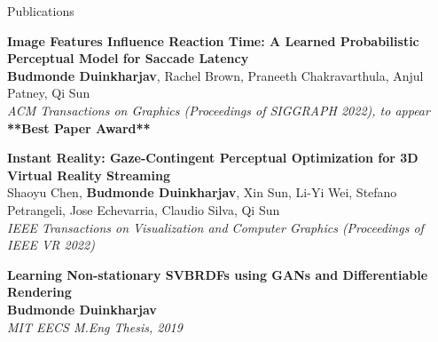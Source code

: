 \documentclass{resume}
\begin{document}
\begin{area}{Publications}
    \item
        \textbf{Image Features Influence Reaction Time: A Learned Probabilistic Perceptual Model for Saccade Latency} \\
        \textbf{Budmonde Duinkharjav}, Rachel Brown, Praneeth Chakravarthula, Anjul Patney, Qi Sun \\
        \emph{ACM Transactions on Graphics (Proceedings of SIGGRAPH 2022), to appear}\\
        \textbf{**Best Paper Award**}
    \item
        \textbf{Instant Reality: Gaze-Contingent Perceptual Optimization for 3D Virtual Reality Streaming} \\
        Shaoyu Chen, \textbf{Budmonde Duinkharjav}, Xin Sun, Li-Yi Wei, Stefano Petrangeli, Jose Echevarria, Claudio Silva, Qi Sun \\
        \emph{IEEE Transactions on Visualization and Computer Graphics (Proceedings of IEEE VR 2022)}
    \item
        \textbf{Learning Non-stationary SVBRDFs using GANs and Differentiable Rendering} \\
        \textbf{Budmonde Duinkharjav} \\
        \emph{MIT EECS M.Eng Thesis, 2019}
\end{area}

\pagebreak
\end{document}
